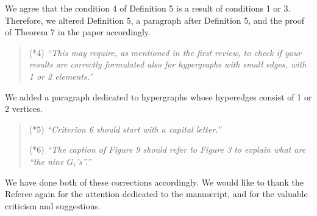 \documentclass[12pt,a4paper]{article}
\theoremstyle{definition}
\numberwithin{equation}{section}
\begin{document}
We agree that the condition 4 of Definition 5 is a result of conditions 1 or 3. Therefore, we altered Definition 5, a paragraph after Definition 5, and the proof of Theorem 7 in the paper accordingly.

\begin{quotation}
         (*4) {\it ``This may require, as mentioned in the first review, to check if your results are correctly formulated also for hypergraphs with small edges, with 1 or 2 elements.''}
\end{quotation}

We added a paragraph dedicated to hypergraphs whose hyperedges consist of 1 or 2 vertices.

\begin{quotation}
        (*5) {\it``Criterion 6 should start with a capital letter.''}

        (*6) {\it ``The caption of Figure 9 should refer to Figure 3 to explain what are ``the nine $G_i$'s''.''}
\end{quotation}

We have done both of these corrections accordingly. We would like to thank the Referee again for the attention dedicated to the manuscript, and for the valuable criticism and suggestions.
\end{document}
